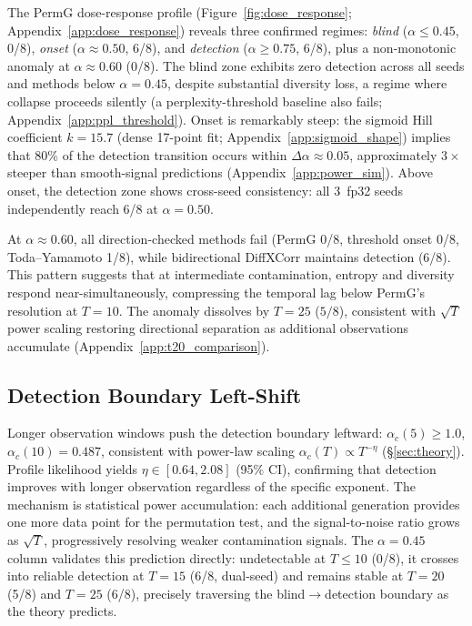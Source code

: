 The PermG dose-response profile (Figure~\ref{fig:dose_response}; Appendix~\ref{app:dose_response}) reveals three confirmed regimes: \emph{blind} ($\alpha \leq 0.45$, 0/8), \emph{onset} ($\alpha \approx 0.50$, 6/8), and \emph{detection} ($\alpha{\geq}0.75$, 6/8), plus a non-monotonic anomaly at $\alpha \approx 0.60$ (0/8).
The blind zone exhibits zero detection across all seeds and methods below $\alpha{=}0.45$, despite substantial diversity loss, a regime where collapse proceeds silently (a perplexity-threshold baseline also fails; Appendix~\ref{app:ppl_threshold}).
Onset is remarkably steep: the sigmoid Hill coefficient $k{=}15.7$ (dense 17-point fit; Appendix~\ref{app:sigmoid_shape}) implies that 80\% of the detection transition occurs within $\Delta\alpha{\approx}0.05$, approximately $3{\times}$ steeper than smooth-signal predictions (Appendix~\ref{app:power_sim}).
Above onset, the detection zone shows cross-seed consistency: all 3~fp32 seeds independently reach 6/8 at $\alpha{=}0.50$.

At $\alpha{\approx}0.60$, all direction-checked methods fail (PermG 0/8, threshold onset 0/8, Toda--Yamamoto 1/8), while bidirectional DiffXCorr maintains detection (6/8).
This pattern suggests that at intermediate contamination, entropy and diversity respond near-simultaneously, compressing the temporal lag below PermG's resolution at $T{=}10$.
The anomaly dissolves by $T{=}25$ ($5/8$), consistent with $\sqrt{T}$ power scaling restoring directional separation as additional observations accumulate (Appendix~\ref{app:t20_comparison}).

\subsection{Detection Boundary Left-Shift}
\label{sec:t20}

Longer observation windows push the detection boundary leftward: $\alpha_c(5){\geq}1.0$, $\alpha_c(10){=}0.487$, consistent with power-law scaling $\alpha_c(T) \propto T^{-\eta}$ (\S\ref{sec:theory}).
Profile likelihood yields $\eta \in [0.64, 2.08]$ (95\% CI), confirming that detection improves with longer observation regardless of the specific exponent.
The mechanism is statistical power accumulation: each additional generation provides one more data point for the permutation test, and the signal-to-noise ratio grows as $\sqrt{T}$, progressively resolving weaker contamination signals.
The $\alpha{=}0.45$ column validates this prediction directly: undetectable at $T{\leq}10$ (0/8), it crosses into reliable detection at $T{=}15$ (6/8, dual-seed) and remains stable at $T{=}20$ (5/8) and $T{=}25$ (6/8), precisely traversing the blind$\to$detection boundary as the theory predicts.


